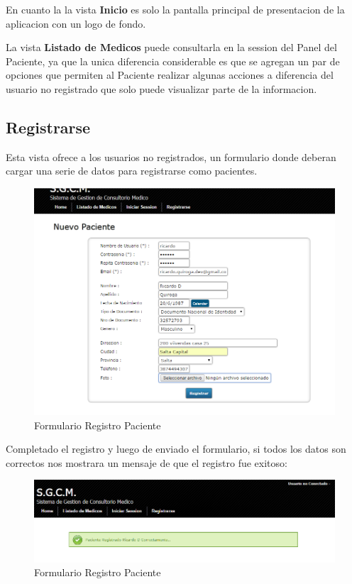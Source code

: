 En cuanto la la vista \textbf{Inicio} es solo la pantalla principal de presentacion
de la aplicacion con un logo de fondo.

La vista \textbf{Listado de Medicos} puede consultarla en la session del
Panel del Paciente, ya que la unica diferencia considerable es que se agregan un
par de opciones que permiten al Paciente realizar algunas acciones a diferencia
del usuario no registrado que solo puede visualizar parte de la informacion.


\subsection{Registrarse}

Esta vista ofrece a los usuarios no registrados, un formulario donde deberan
cargar una serie de datos para registrarse como pacientes.

\begin{figure}[H]
    \centering
    \includegraphics[scale=0.5]{resourse/registrar-paciente.png}
    \caption{Formulario Registro Paciente}
    \label{fig:62}
\end{figure}

Completado el registro y luego de enviado el formulario, si todos los datos son
correctos nos mostrara un mensaje de que el registro fue exitoso:

\begin{figure}[H]
    \centering
    \includegraphics[scale=0.5]{resourse/registro-exito.png}
    \caption{Formulario Registro Paciente}
    \label{fig:63}
\end{figure}

